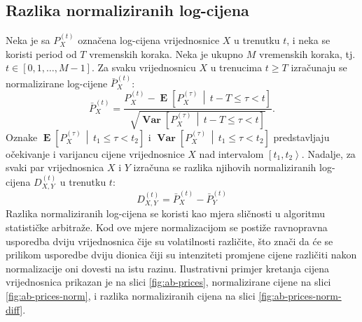 \documentclass[lmodern, utf8, diplomski, numeric]{fer}
\newcommand{\Efromto}[2]{\operatorname{\mathbf{E}}\q[#1\, \middle\vert\, #2\w]}
\newcommand{\Varfromto}[2]{\operatorname{\mathbf{Var}}\q[#1\, \middle\vert\, #2\w]}
\newcommand{\norm}[1]{\bar{#1}}
\newcommand{\q}{\left}
\newcommand{\w}{\right}
\begin{document}
  \subsection{Razlika normaliziranih log-cijena}
  Neka je sa $P_X^{\q(t\w)}$ označena log-cijena vrijednosnice $X$ u trenutku $t$, i neka se koristi period od $T$ vremenskih koraka.
  Neka je ukupno $M$ vremenskih koraka, tj. $t \in \q[0, 1, \ldots, M - 1\w]$.
  Za svaku vrijednosnicu $X$ u trenucima $t \ge T$ izračunaju se normalizirane log-cijene $\norm{P}_X^{\q(t\w)}$:
  \begin{equation}
  \norm{P}_X^{\q(t\w)} = \frac{P_X^{\q(t\w)} - \Efromto{P_X^{(\tau)}}{t-T \le \tau < t}}{\sqrt{\Varfromto{P_X^{(\tau)}}{t-T \le \tau < t}}}.
  \end{equation}
  Oznake $\Efromto{P_X^{(\tau)}}{t_1 \le \tau < t_2}$ i $\Varfromto{P_X^{(\tau)}}{t_1 \le \tau < t_2}$ predstavljaju očekivanje i varijancu cijene vrijednosnice $X$ nad intervalom $\q[t_1, t_2\w\rangle$.
  Nadalje, za svaki par vrijednosnica $X$ i $Y$ izračuna se razlika njihovih normaliziranih log-cijena $D_{X,Y}^{\q(t\w)}$ u trenutku $t$:
  \begin{equation}
  D_{X,Y}^{\q(t\w)} = \norm{P}_X^{\q(t\w)} - \norm{P}_Y^{\q(t\w)}
  \end{equation}
  Razlika normaliziranih log-cijena se koristi kao mjera sličnosti u algoritmu statističke arbitraže.
  Kod ove mjere normalizacijom se postiže ravnopravna usporedba dviju vrijednosnica čije su volatilnosti različite, što znači da će se prilikom usporedbe dviju dionica čiji su intenziteti promjene cijene različiti nakon normalizacije oni dovesti na istu razinu.
  Ilustrativni primjer kretanja cijena vrijednosnica prikazan je na slici \ref{fig:ab-prices}, normalizirane cijene na slici \ref{fig:ab-prices-norm}, i razlika normaliziranih cijena na slici \ref{fig:ab-prices-norm-diff}.
  
\end{document}
